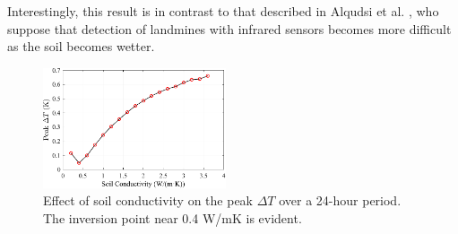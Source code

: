         
        Interestingly, this result is in contrast to that described in Alqudsi et al. \cite{alqudsi2021review}, who suppose that detection of landmines with infrared sensors becomes more difficult as the soil becomes wetter.

        \begin{figure}
            \centering
            \includegraphics[width=0.48\textwidth]{figs/Rory/thermal_sensitivity_conductivity.pdf}
            \caption[Effect of soil conductivity on the peak $\Delta T$ over a 24-hour period]{Effect of soil conductivity on the peak $\Delta T$ over a 24-hour period. The inversion point near 0.4 W/mK is evident.}
            \label{fig:conductivity}
        \end{figure}
        